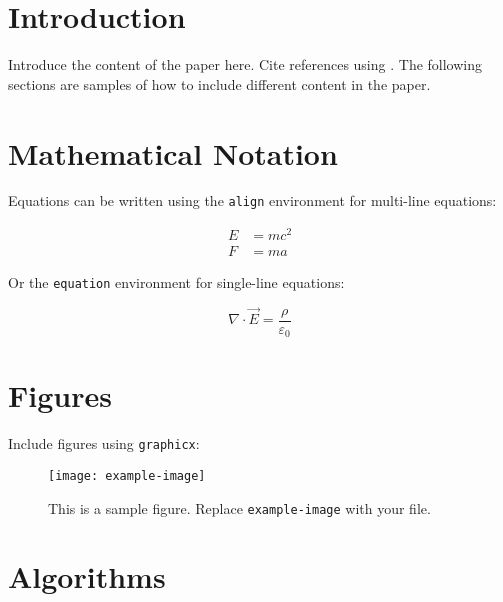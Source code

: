 \documentclass[twoside]{article}
\title{\customtitle{Your Paper Title}}
\author{
    Author One$^1$, Author Two$^2$, Author Three$^1$ \\
    {$^1$Affiliation One, $^2$Affiliation Two} \\
    \texttt{author.one@example.com, author.two@example.com, author.three@example.com}
}
\date{}
\begin{document}
\maketitle

\begin{abstract}
This is the abstract. It summarises the key contributions of the paper.
\end{abstract}


\section{Introduction}

Introduce the content of the paper here. Cite references using \cite{example}. The following sections are samples of how to include different content in the paper.

\section{Mathematical Notation}

Equations can be written using the \texttt{align} environment for multi-line equations:

\begin{align}
    E &= mc^2 \\
    F &= ma
\end{align}

Or the \texttt{equation} environment for single-line equations:

\begin{equation}
    \nabla \cdot \vec{E} = \frac{\rho}{\varepsilon_0}
\end{equation}

\section{Figures}

Include figures using \texttt{graphicx}:

\begin{figure}[ht]
    \centering
    \texttt{[image: example-image]}
    \caption{This is a sample figure. Replace \texttt{example-image} with your file.}
    \label{fig:example}
\end{figure}

\section{Algorithms}
\end{document}
